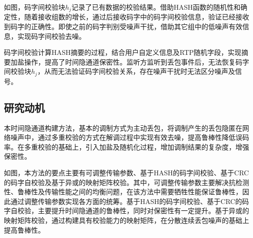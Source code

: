 如图，码字间校验块$h_{j}$记录了已有数据的校验结果。借助HASH函数的随机性和确定性，随着接收组数的增长，通过后接收码字中的码字间校验信息，验证已经接收到码字的正确性。即使之前的码字判别受噪声干扰，借助其它组中的低噪声有效信息，实现码字间校验去噪。

码字间校验计算HASH摘要的过程，结合用户自定义信息及RTP随机字段，实现摘要加盐操作，提高了时间隐通道保密性。监听方监听到丢包事件后，无法恢复码字间校验块$h_{j}$，从而无法验证码字间校验关系，存在噪声干扰时无法区分噪声及信号。

\subsection{研究动机}
\label{chap:hash:motivation:motivation}

本时间隐通道构建方法，基本的调制方式为主动丢包，将调制产生的丢包隐匿在网络噪声中，通过多重校验的方式在解调过程中实现有效去噪，提高鲁棒性降低误码率。在多重校验的基础上，引入加盐及随机化过程，增加调制结果的复杂度，增强保密性。


如图，本方法的要点主要有可调整传输参数、基于HASH的码字间校验、基于CRC的码字自校验及基于异或的映射矩阵校验。其中，可调整传输参数主要解决抗检测性、鲁棒性及传输性能之间的均衡问题，在该方法中需要牺牲性能保证鲁棒性，因此通过调整传输参数实现各方面的统筹。基于HASH的码字间校验、基于CRC的码字自校验，主要提升时间隐通道的鲁棒性，同时对保密性有一定提升。基于异或的映射矩阵校验，通过构建具有校验能力的映射矩阵，在分散连续丢包噪声的基础上提高鲁棒性。